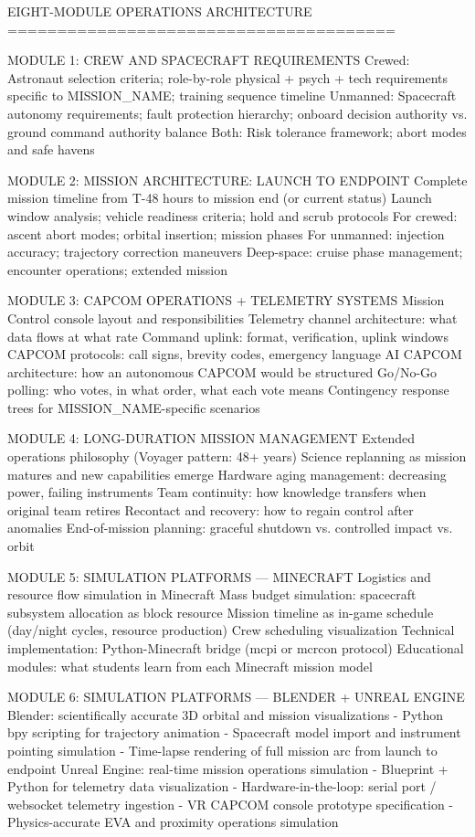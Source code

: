 \documentclass[11pt,letterpaper]{article}
\begin{document}
\begin{asciibox}
EIGHT-MODULE OPERATIONS ARCHITECTURE
=======================================

MODULE 1: CREW AND SPACECRAFT REQUIREMENTS
  Crewed: Astronaut selection criteria; role-by-role physical + psych + tech
          requirements specific to {MISSION\_NAME}; training sequence timeline
  Unmanned: Spacecraft autonomy requirements; fault protection hierarchy;
            onboard decision authority vs. ground command authority balance
  Both: Risk tolerance framework; abort modes and safe havens

MODULE 2: MISSION ARCHITECTURE: LAUNCH TO ENDPOINT
  Complete mission timeline from T-48 hours to mission end (or current status)
  Launch window analysis; vehicle readiness criteria; hold and scrub protocols
  For crewed: ascent abort modes; orbital insertion; mission phases
  For unmanned: injection accuracy; trajectory correction maneuvers
  Deep-space: cruise phase management; encounter operations; extended mission

MODULE 3: CAPCOM OPERATIONS + TELEMETRY SYSTEMS
  Mission Control console layout and responsibilities
  Telemetry channel architecture: what data flows at what rate
  Command uplink: format, verification, uplink windows
  CAPCOM protocols: call signs, brevity codes, emergency language
  AI CAPCOM architecture: how an autonomous CAPCOM would be structured
  Go/No-Go polling: who votes, in what order, what each vote means
  Contingency response trees for {MISSION\_NAME}-specific scenarios

MODULE 4: LONG-DURATION MISSION MANAGEMENT
  Extended operations philosophy (Voyager pattern: 48+ years)
  Science replanning as mission matures and new capabilities emerge
  Hardware aging management: decreasing power, failing instruments
  Team continuity: how knowledge transfers when original team retires
  Recontact and recovery: how to regain control after anomalies
  End-of-mission planning: graceful shutdown vs. controlled impact vs. orbit

MODULE 5: SIMULATION PLATFORMS --- MINECRAFT
  Logistics and resource flow simulation in Minecraft
  Mass budget simulation: spacecraft subsystem allocation as block resource
  Mission timeline as in-game schedule (day/night cycles, resource production)
  Crew scheduling visualization
  Technical implementation: Python-Minecraft bridge (mcpi or mcrcon protocol)
  Educational modules: what students learn from each Minecraft mission model

MODULE 6: SIMULATION PLATFORMS --- BLENDER + UNREAL ENGINE
  Blender: scientifically accurate 3D orbital and mission visualizations
    - Python bpy scripting for trajectory animation
    - Spacecraft model import and instrument pointing simulation
    - Time-lapse rendering of full mission arc from launch to endpoint
  Unreal Engine: real-time mission operations simulation
    - Blueprint + Python for telemetry data visualization
    - Hardware-in-the-loop: serial port / websocket telemetry ingestion
    - VR CAPCOM console prototype specification
    - Physics-accurate EVA and proximity operations simulation


\end{asciibox}
\end{document}
